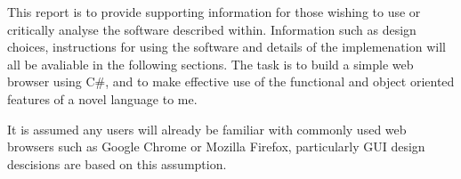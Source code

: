 \documentclass[../Main.tex]{subfiles}
\begin{document}
This report is to provide supporting information for those wishing to use or critically analyse the software described within. Information such as design choices, instructions for using the software and details of the implemenation will all be avaliable in the following sections.
The task is to build a simple web browser using C\#, and to make effective use of the functional and object oriented features of a novel language to me. 

It is assumed any users will already be familiar with commonly used web browsers such as Google Chrome or Mozilla Firefox, particularly GUI design descisions are based on this assumption. 
\end{document}
